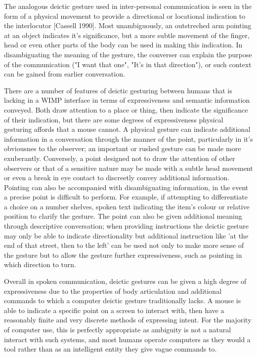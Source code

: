 The analogous deictic gesture used in inter-personal communication is seen in the form of a physical movement to provide a directional or locational indication to the interlocutor [Cassell 1990]. Most unambiguously, an outstreched arm pointing at an object indicates it's significance, but a more subtle movement of the finger, head or even other parts of the body can be used in making this indication. In disambiguating the meaning of the gesture, the converser can explain the purpose of the communication ("I want that one", "It's in that direction"),  or such context can be gained from earlier conversation.

There are a number of features of deictic gesturing between humans that is lacking in a WIMP interface in terms of expressiveness and semantic information conveyed. Both draw attention to a place or thing, then indicate the significance of their indication, but there are some degrees of expressiveness physical gesturing affords that a mouse cannot. A physical gesture can indicate additional information in a conversation through the manner of the point, particularly in it's obviousnes to the observer; an important or rushed gesture can be made more exuberantly. Conversely, a point designed not to draw the attention of other observers or that of a sensitive nature may be made with a subtle head movement or even a break in eye contact to discreetly convey additional information. Pointing can also be accompanied with disambiguating information, in the event a precise point is difficult to perform. For example, if attempting to differentiate a choice on a number shelves, spoken text indicating the item's colour or relative position to clarify the gesture. The point can also be given additional meaning through descriptive conversation; when providing instructions the deictic gesture may only be able to indicate directionality but additional instruction like 'at the end of that street, then to the left' can be used not only to make more sense of the gesture but to allow the gesture further expressiveness, such as pointing in which direction to turn.

Overall in spoken communication, deictic gestures can be given a high degree of expressiveness due to the properties of body articulation and additional commands to which a computer deictic gesture traditionally lacks. A mouse is able to indicate a specific point on a screen to interact with, then have a reasonably finite and very discrete methods of expressing intent. For the majority of computer use, this is perfectly appropriate as ambiguity is not a natural interact with such systems, and most humans operate computers as they would a tool rather than as an intelligent entity they give vague commands to.

